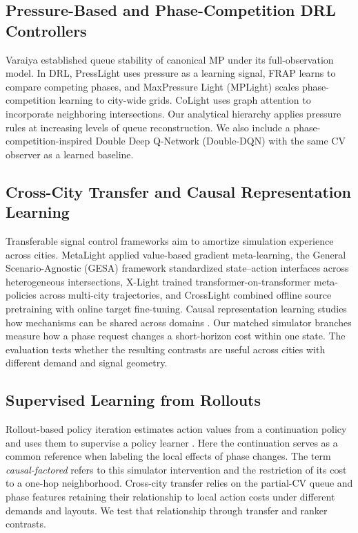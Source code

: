 \documentclass[letterpaper,journal]{IEEEtran}
\begin{document}
\subsection{Pressure-Based and Phase-Competition DRL Controllers}
Varaiya \cite{varaiya2013maxpressure} established queue stability of canonical MP under its full-observation model. In DRL, PressLight \cite{wei2019presslight} uses pressure as a learning signal, FRAP \cite{zheng2019frap} learns to compare competing phases, and MaxPressure Light (MPLight) \cite{chen2020thousandlights} scales phase-competition learning to city-wide grids. CoLight \cite{wei2019colight} uses graph attention to incorporate neighboring intersections. Our analytical hierarchy applies pressure rules at increasing levels of queue reconstruction. We also include a phase-competition-inspired Double Deep Q-Network (Double-DQN) \cite{vanhasselt2015double} with the same CV observer as a learned baseline.

\subsection{Cross-City Transfer and Causal Representation Learning}
Transferable signal control frameworks aim to amortize simulation experience across cities. MetaLight \cite{zang2020metalight} applied value-based gradient meta-learning, the General Scenario-Agnostic (GESA) framework \cite{jiang2024gesa} standardized state--action interfaces across heterogeneous intersections, X-Light \cite{jiang2024xlight} trained transformer-on-transformer meta-policies across multi-city trajectories, and CrossLight \cite{sun2024crosslight} combined offline source pretraining with online target fine-tuning. Causal representation learning studies how mechanisms can be shared across domains \cite{bengio2019meta,scholkopf2021causal,feng2022factored}. Our matched simulator branches measure how a phase request changes a short-horizon cost within one state. The evaluation tests whether the resulting contrasts are useful across cities with different demand and signal geometry.

\subsection{Supervised Learning from Rollouts}
Rollout-based policy iteration estimates action values from a continuation policy and uses them to supervise a policy learner \cite{lagoudakis2003rollout,dimitrakakis2008rollout}. Here the continuation serves as a common reference when labeling the local effects of phase changes. The term \emph{causal-factored} refers to this simulator intervention and the restriction of its cost to a one-hop neighborhood. Cross-city transfer relies on the partial-CV queue and phase features retaining their relationship to local action costs under different demands and layouts. We test that relationship through transfer and ranker contrasts.
\end{document}
